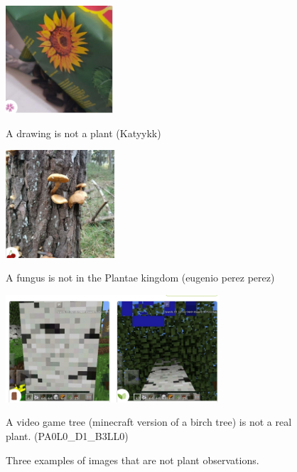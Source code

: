 \begin{figure}[bth]
        \centering
        \begin{minipage}[t]{0.25\textwidth}
            \centering
            \includegraphics[width=\textwidth,height=4cm]{./images_plantnet/katyykkk_no_plant.png}
            \caption*{A drawing is not a plant (\textcopyright Katyykk)}
        \end{minipage}
        \hfill
        \begin{minipage}[t]{0.25\textwidth}
            \centering
            \includegraphics[width=\textwidth,height=4cm]{./images_plantnet/eugenio_perez_perez_shroom.png}
            \caption*{A fungus is not in the Plantae kingdom (\textcopyright eugenio perez perez)}
        \end{minipage}
        \hfill
         \begin{minipage}[t]{0.47\textwidth}
                \centering
                \includegraphics[width=\textwidth,height=4cm]{./images_plantnet/PA0L0_D1_B3LL0_minecraft.png}
                \caption*{A video game tree (minecraft version of a birch tree) is not a real plant. (\textcopyright PA0L0\_D1\_B3LL0)}
            \end{minipage}
        \caption{Three examples of images that are not plant observations.}
        \label{fig:not_an_observation}
    \end{figure}

